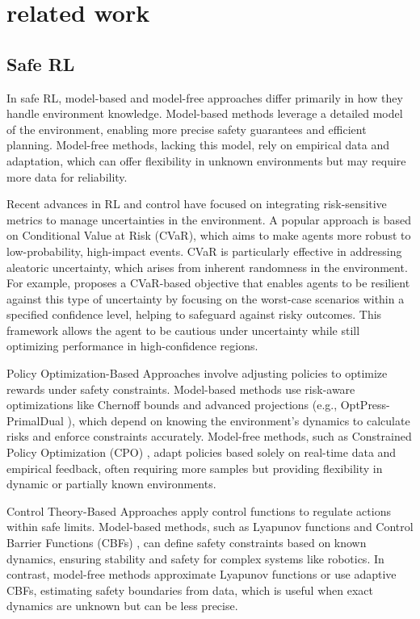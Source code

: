 \section{related work}
\subsection{Safe RL}

In safe RL, model-based and model-free approaches differ primarily in how they handle environment knowledge. Model-based methods leverage a detailed model of the environment, enabling more precise safety guarantees and efficient planning. Model-free methods, lacking this model, rely on empirical data and adaptation, which can offer flexibility in unknown environments but may require more data for reliability. 

Recent advances in RL and control have focused on integrating risk-sensitive metrics to manage uncertainties in the environment\cite{chapman2021risk}\cite{chow2018risk}. A popular approach is based on Conditional Value at Risk (CVaR), which aims to make agents more robust to low-probability, high-impact events. CVaR is particularly effective in addressing aleatoric uncertainty, which arises from inherent randomness in the environment. For example, \cite{tang2019worst} proposes a CVaR-based objective that enables agents to be resilient against this type of uncertainty by focusing on the worst-case scenarios within a specified confidence level, helping to safeguard against risky outcomes. This framework allows the agent to be cautious under uncertainty while still optimizing performance in high-confidence regions.

Policy Optimization-Based Approaches involve adjusting policies to optimize rewards under safety constraints. Model-based methods use risk-aware optimizations like Chernoff bounds \cite{moldovan2012risk} and advanced projections (e.g., OptPress-PrimalDual \cite{liu2021learning}), which depend on knowing the environment’s dynamics to calculate risks and enforce constraints accurately. Model-free methods, such as Constrained Policy Optimization (CPO) \cite{achiam2017constrained}, adapt policies based solely on real-time data and empirical feedback, often requiring more samples but providing flexibility in dynamic or partially known environments.

Control Theory-Based Approaches apply control functions to regulate actions within safe limits. Model-based methods, such as Lyapunov functions \cite{chow2018lyapunov}\cite{perkins2002lyapunov} and Control Barrier Functions (CBFs) \cite{ma2021model}, can define safety constraints based on known dynamics, ensuring stability and safety for complex systems like robotics. In contrast, model-free methods approximate Lyapunov functions or use adaptive CBFs, estimating safety boundaries from data, which is useful when exact dynamics are unknown but can be less precise.

